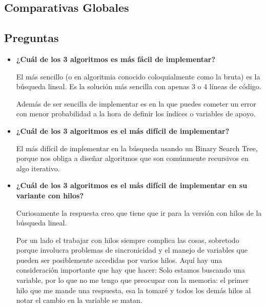 \documentclass[12pt, fleqn]{article}                             %
\theoremstyle{break}                                            %
\begin{document}
    \subsection{Comparativas Globales}


    \subsection{Preguntas}


        \begin{itemize}
            \item 
                \textbf{¿Cuál de los 3 algoritmos es más fácil de implementar?}

                El más sencillo (o en algoritmia conocido coloquialmente como la bruta)
                es la búsqueda lineal. Es la solución más sencilla con apenas 3 o 4 líneas de código.

                Además de ser sencilla de implementar es en la que puedes cometer un error con menor
                probabilidad a la hora de definir los índices o variables de apoyo.

            \item 
                \textbf{¿Cuál de los 3 algoritmos es el más difícil de implementar?}

                El más difícil de implementar en la búsqueda usando un Binary Search Tree, porque
                nos obliga a diseñar algoritmos que son comúnmente recursivos en algo
                iterativo.

            \item
                \textbf{¿Cuál de los 3 algoritmos es el más difícil de implementar en su variante
                con hilos?}

                Curiosamente la respuesta creo que tiene que ir para la versión con hilos de la búsqueda
                lineal.

                Por un lado el trabajar con hilos siempre complica las cosas, sobretodo porque involucra
                problemas de sincronicidad y el manejo de variables que pueden ser posiblemente accedidas
                por varios hilos. Aquí hay una consideración importante que hay que hacer:
                Solo estamos buscando una variable, por lo que no me tengo que preocupar con la memoria: 
                el primer hilo que me mande una respuesta, esa la tomaré y todos los demás hilos al notar
                el cambio en la variable se matan.


\end{itemize}
\end{document}
